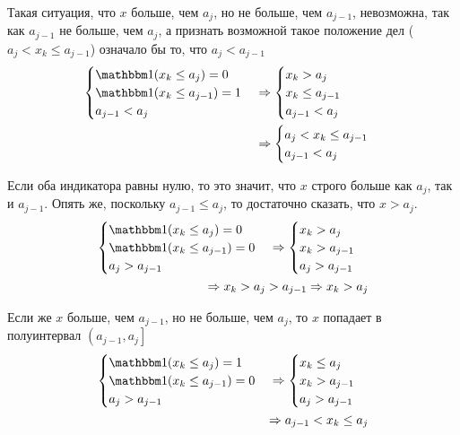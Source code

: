 Такая ситуация,
что $x$ больше, чем $a_j$, но не больше, чем $a_{j-1}$, невозможна,
так как $a_{j-1}$ не больше, чем $a_j$,
а признать возможной такое положение дел ($a_j<x_k\le a_{j-1}$)
означало бы то, что $a_j<a_{j-1}$
\begin{align*}
  \begin{cases}
    \indicator{x_k\le a_j}=0\\
    \indicator{x_k\le a_{j-1}}=1\\
    a_{j-1} < a_j
  \end{cases}
  &\Rightarrow
  \begin{cases}
    x_k>a_j\\
    x_k\le a_{j-1}\\
    a_{j-1} < a_j
  \end{cases}
  \\&\Rightarrow
  \begin{cases}
    a_j<x_k\le a_{j-1}\\
    a_{j-1} < a_j
  \end{cases}
\end{align*}


Если оба индикатора равны нулю,
то это значит, что $x$ строго больше как $a_j$, так и $a_{j-1}$.
Опять же, поскольку $a_{j-1}\le a_j$, то достаточно сказать, что $x>a_j$.
\begin{align*}
  \begin{cases}
    \indicator{x_k\le a_j}=0\\
    \indicator{x_k\le a_{j-1}}=0\\
    a_j > a_{j-1}
  \end{cases}
  \Rightarrow
  \begin{cases}
    x_k>a_j\\
    x_k>a_{j-1}\\
    a_j > a_{j-1}
  \end{cases}
  \\\Rightarrow
    x_k>a_j > a_{j-1}
  \Rightarrow
    x_k>a_j
\end{align*}

Если же $x$ больше, чем $a_{j-1}$, но не больше, чем $a_j$,
то $x$ попадает в полуинтервал $\left(a_{j-1},a_j\right]$
\begin{align*}
  \begin{cases}
    \indicator{x_k\le a_j}=1\\
    \indicator{x_k\le a_{j-1}}=0\\
    a_j > a_{j-1}
  \end{cases}
  \Rightarrow
  \begin{cases}
    x_k\le a_j\\
    x_k>a_{j-1}\\
    a_j > a_{j-1}
  \end{cases}
  \\\Rightarrow
    a_{j-1}<x_k\le a_j
\end{align*}

